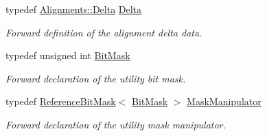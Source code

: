 \begin{DoxyCompactItemize}
typedef \hyperlink{class_d_d4hep_1_1_alignments_1_1_delta}{Alignments::Delta} \hyperlink{class_d_d4hep_1_1_alignments_1_1_alignment_data_a3e67a5cbb3449006e9552b0f7bd98d45}{Delta}
\begin{DoxyCompactList}\small\item\em Forward definition of the alignment delta data. \item\end{DoxyCompactList}\item 
typedef unsigned int \hyperlink{class_d_d4hep_1_1_alignments_1_1_alignment_data_ab5c31f7e5512ca675be8323bc723b123}{BitMask}
\begin{DoxyCompactList}\small\item\em Forward declaration of the utility bit mask. \item\end{DoxyCompactList}\item 
typedef \hyperlink{class_d_d4hep_1_1_reference_bit_mask}{ReferenceBitMask}$<$ \hyperlink{class_d_d4hep_1_1_alignments_1_1_alignment_data_ab5c31f7e5512ca675be8323bc723b123}{BitMask} $>$ \hyperlink{class_d_d4hep_1_1_alignments_1_1_alignment_data_a7eb85e9201294a4ae7a3c5fe6d913233}{MaskManipulator}
\begin{DoxyCompactList}\small\item\em Forward declaration of the utility mask manipulator. \item\end{DoxyCompactList}\end{DoxyCompactItemize}
